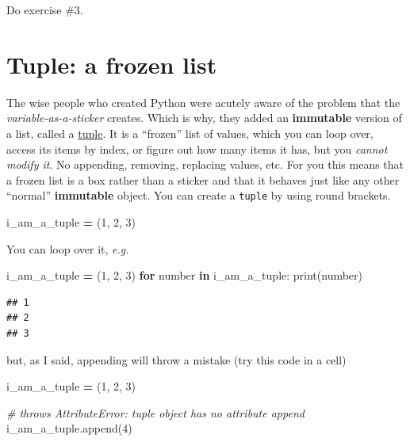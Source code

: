 \documentclass[
]{book}
\newenvironment{Shaded}{\begin{snugshade}}{\end{snugshade}}
\newcommand{\BuiltInTok}[1]{#1}
\newcommand{\CommentTok}[1]{\textcolor[rgb]{0.56,0.35,0.01}{\textit{#1}}}
\newcommand{\ControlFlowTok}[1]{\textcolor[rgb]{0.13,0.29,0.53}{\textbf{#1}}}
\newcommand{\DecValTok}[1]{\textcolor[rgb]{0.00,0.00,0.81}{#1}}
\newcommand{\KeywordTok}[1]{\textcolor[rgb]{0.13,0.29,0.53}{\textbf{#1}}}
\newcommand{\NormalTok}[1]{#1}
\newcommand{\OperatorTok}[1]{\textcolor[rgb]{0.81,0.36,0.00}{\textbf{#1}}}
\begin{document}
Do exercise \#3.

\hypertarget{tuple-a-frozen-list}{%
\section{Tuple: a frozen list}\label{tuple-a-frozen-list}}

The wise people who created Python were acutely aware of the problem that the \emph{variable-as-a-sticker} creates. Which is why, they added an \textbf{immutable} version of a list, called a \href{https://docs.python.org/3/library/stdtypes.html?highlight=tuple\#tuple}{tuple}. It is a ``frozen'' list of values, which you can loop over, access its items by index, or figure out how many items it has, but you \emph{cannot modify it}. No appending, removing, replacing values, etc. For you this means that a frozen list is a box rather than a sticker and that it behaves just like any other ``normal'' \textbf{immutable} object. You can create a \texttt{tuple} by using round brackets.

\begin{Shaded}
\begin{Highlighting}[]
\NormalTok{i\_am\_a\_tuple }\OperatorTok{=}\NormalTok{ (}\DecValTok{1}\NormalTok{, }\DecValTok{2}\NormalTok{, }\DecValTok{3}\NormalTok{)}
\end{Highlighting}
\end{Shaded}

You can loop over it, \emph{e.g.}

\begin{Shaded}
\begin{Highlighting}[]
\NormalTok{i\_am\_a\_tuple }\OperatorTok{=}\NormalTok{ (}\DecValTok{1}\NormalTok{, }\DecValTok{2}\NormalTok{, }\DecValTok{3}\NormalTok{)}
\ControlFlowTok{for}\NormalTok{ number }\KeywordTok{in}\NormalTok{ i\_am\_a\_tuple:}
    \BuiltInTok{print}\NormalTok{(number)}
\end{Highlighting}
\end{Shaded}

\begin{verbatim}
## 1
## 2
## 3
\end{verbatim}

but, as I said, appending will throw a mistake (try this code in a cell)

\begin{Shaded}
\begin{Highlighting}[]
\NormalTok{i\_am\_a\_tuple }\OperatorTok{=}\NormalTok{ (}\DecValTok{1}\NormalTok{, }\DecValTok{2}\NormalTok{, }\DecValTok{3}\NormalTok{)}

\CommentTok{\# throws AttributeError: \textquotesingle{}tuple\textquotesingle{} object has no attribute \textquotesingle{}append\textquotesingle{}}
\NormalTok{i\_am\_a\_tuple.append(}\DecValTok{4}\NormalTok{)}
\end{Highlighting}
\end{Shaded}
\end{document}
